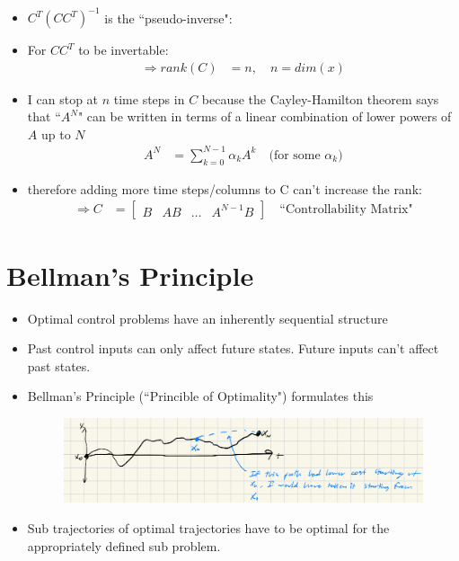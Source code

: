 \documentclass[11pt]{article}
\begin{document}
\begin{itemize}
\begin{align*}
    \end{align*}
    \item $C^T(CC^T)^{-1}$ is the ``pseudo-inverse":
    \item For $CC^T$ to be invertable: 
    \begin{align*}
        \Rightarrow rank(C) &= n, \quad n=dim(x)
    \end{align*}
    \item I can stop at $n$ time steps in $C$ because the Cayley-Hamilton theorem says that ``$A^N$" can be written in terms of a linear combination of lower powers of $A$ up to $N$
    \begin{align*}
        A^N &= \sum_{k=0}^{N-1}\alpha_kA^k \quad\text{(for some } \alpha_k)
    \end{align*}
    \item therefore adding more time steps/columns to C can't increase the rank:
    \begin{align*}
        \Rightarrow C &= \begin{bmatrix}
            B & AB & \dots & A^{N-1}B
        \end{bmatrix}\quad \text{``Controllability Matrix"}
    \end{align*}
\end{itemize}


\section{Bellman's Principle}
\begin{itemize}
    \item Optimal control problems have an inherently sequential structure
    \item Past control inputs can only affect future states. Future inputs can't affect past states.
    \item Bellman's Principle (``Princible of Optimality") formulates this
    \begin{figure}[H]
        \centering
        \includegraphics[width=0.9\linewidth]{l9_1.png}
    \end{figure}
    \item Sub trajectories of optimal trajectories have to be optimal for the appropriately defined sub problem.
\end{itemize}
\end{document}
